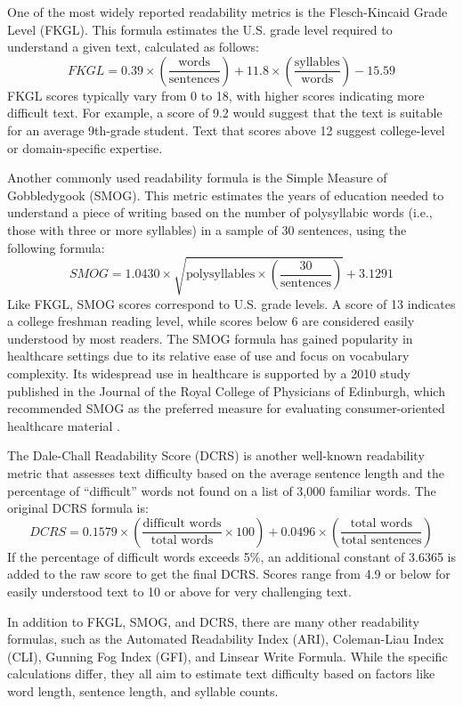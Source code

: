 One of the most widely reported readability metrics is the Flesch-Kincaid Grade Level (FKGL). This formula estimates the U.S. grade level required to understand a given text, calculated as follows:
$$FKGL = 0.39 \times \left(\frac{\text{words}}{\text{sentences}}\right) + 11.8 \times \left(\frac{\text{syllables}}{\text{words}}\right) - 15.59$$
FKGL scores typically vary from 0 to 18, with higher scores indicating more difficult text. For example, a score of 9.2 would suggest that the text is suitable for an average 9th-grade student. Text that scores above 12 suggest college-level or domain-specific expertise.

Another commonly used readability formula is the Simple Measure of Gobbledygook (SMOG). This metric estimates the years of education needed to understand a piece of writing based on the number of polysyllabic words (i.e., those with three or more syllables) in a sample of 30 sentences, using the following formula:
$$SMOG = 1.0430 \times \sqrt{\text{polysyllables} \times \left(\frac{30}{\text{sentences}}\right)} + 3.1291$$
Like FKGL, SMOG scores correspond to U.S. grade levels. A score of 13 indicates a college freshman reading level, while scores below 6 are considered easily understood by most readers. The SMOG formula has gained popularity in healthcare settings due to its relative ease of use and focus on vocabulary complexity. Its widespread use in healthcare is supported by a 2010 study published in the Journal of the Royal College of Physicians of Edinburgh, which recommended SMOG as the preferred measure for evaluating consumer-oriented healthcare material \cite{Fitzsimmons2010-mq}.

The Dale-Chall Readability Score (DCRS) is another well-known readability metric that assesses text difficulty based on the average sentence length and the percentage of ``difficult'' words not found on a list of 3,000 familiar words. The original DCRS formula is:
$$DCRS = 0.1579 \times \left(\frac{\text{difficult words}}{\text{total words}} \times 100\right) + 0.0496 \times \left(\frac{\text{total words}}{\text{total sentences}}\right)$$
If the percentage of difficult words exceeds 5\%, an additional constant of 3.6365 is added to the raw score to get the final DCRS. Scores range from 4.9 or below for easily understood text to 10 or above for very challenging text.

In addition to FKGL, SMOG, and DCRS, there are many other readability formulas, such as the Automated Readability Index (ARI), Coleman-Liau Index (CLI), Gunning Fog Index (GFI), and Linsear Write Formula. While the specific calculations differ, they all aim to estimate text difficulty based on factors like word length, sentence length, and syllable counts.

